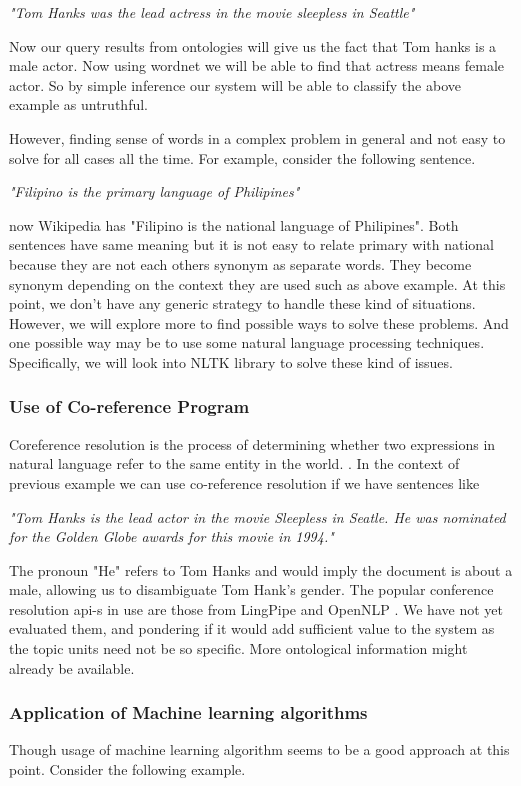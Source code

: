\documentclass[11pt]{article}
\begin{document}
\emph{"Tom Hanks was the lead actress in the movie sleepless in Seattle"}

Now our query results from ontologies will give us the fact that Tom hanks is a male actor. Now using wordnet we will be able to find that actress means female actor. So by simple inference our system will be able to classify the above example as untruthful.

However, finding sense of words in a complex problem in general and not easy to solve for all cases all the time. For example, consider the following sentence.

\emph{"Filipino is the primary language of Philipines"}

now Wikipedia has "Filipino is the national language of Philipines". Both sentences have same meaning but it is not easy to relate primary with national because they are not each others synonym as separate words. They become synonym depending on the context they are used such as above example. At this point, we don't have any generic strategy to handle these kind of situations. However, we will explore more to find possible ways to solve these problems. And one possible way may be to use some natural language processing techniques. Specifically, we will look into NLTK library to solve these kind of issues.

\subsubsection{Use of Co-reference Program}
Coreference resolution is the process of determining whether two
expressions in natural language refer to the same entity in the world.
\cite{doi:10.1162/089120101753342653}.
In the context of previous example we can use co-reference resolution
if we have sentences like


\emph{"Tom Hanks is the lead actor in the movie Sleepless in Seatle.
He was nominated for the Golden Globe awards for this movie in 1994."
}

The pronoun "He" refers to Tom Hanks and would imply
the document is about a male, allowing us to disambiguate Tom Hank's
gender. The popular conference resolution api-s in use are those from
LingPipe\cite{LingPipecoref} and OpenNLP \cite{OpenNLPcoref}. We have
not yet evaluated them, and pondering if it would add sufficient value
to the system as the topic units need not be so specific. More
ontological information might already be available.




\subsubsection{Application of Machine learning algorithms}
Though usage of machine learning algorithm seems to be a good approach at
this point. Consider the following example.
\end{document}
